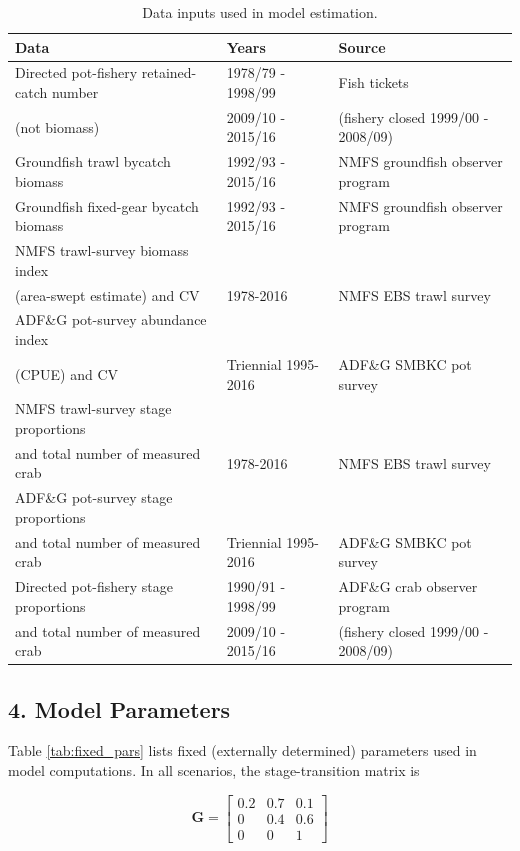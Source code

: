 \documentclass[]{article}
\begin{document}
\begin{table}[ht]
\centering
\caption{Data inputs used in model estimation.} 
\label{tab:model_data}
\begin{tabular}{lll}
  \hline
  Data & Years & Source \\
  \hline
  Directed pot-fishery retained-catch number & 1978/79 - 1998/99 & Fish tickets \\
  (not biomass) & 2009/10 - 2015/16 & (fishery closed 1999/00 - 2008/09)\\
  \hline
  Groundfish trawl bycatch biomass & 1992/93 - 2015/16 & NMFS groundfish observer program \\
  \hline
  Groundfish fixed-gear bycatch biomass & 1992/93 - 2015/16 & NMFS groundfish observer program \\
  \hline
  NMFS trawl-survey biomass index & & \\
  (area-swept estimate) and CV & 1978-2016 & NMFS EBS trawl survey \\
  \hline
  ADF\&G pot-survey abundance index & & \\
  (CPUE) and CV & Triennial 1995-2016 & ADF\&G SMBKC pot survey \\
  \hline
  NMFS trawl-survey stage proportions & & \\
  and total number of measured crab & 1978-2016 & NMFS EBS trawl survey \\
  \hline
  ADF\&G pot-survey stage proportions & & \\
  and total number of measured crab & Triennial 1995-2016 & ADF\&G SMBKC pot survey \\
  \hline
  Directed pot-fishery stage proportions & 1990/91 - 1998/99 & ADF\&G crab observer program \\
  and total number of measured crab & 2009/10 - 2015/16 & (fishery closed 1999/00 - 2008/09) \\
  \hline
\end{tabular}
\end{table}

\subsection{4. Model Parameters}\label{model-parameters}

Table \ref{tab:fixed_pars} lists fixed (externally determined)
parameters used in model computations. In all scenarios, the
stage-transition matrix is

\begin{equation}
  \label{eq:size_transition}
  \boldsymbol{G} =
  \left[ \begin{array}{ccc}
    0.2 & 0.7 & 0.1 \\
    0 & 0.4 & 0.6 \\
    0 & 0 & 1 \end{array} \right]
\end{equation}
\end{document}
